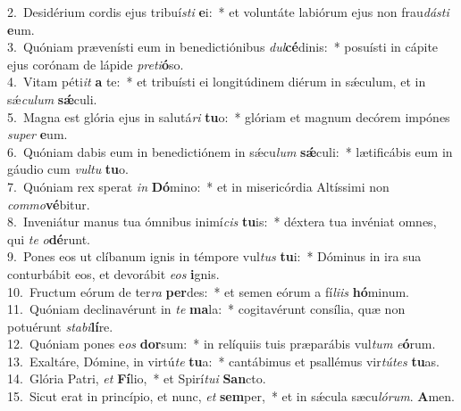 {2.~}Desidérium cordis ejus tribuí\textit{sti} \textbf{e}i:~* et voluntáte labiórum ejus non frau\textit{dá}\textit{sti} \textbf{e}um.\\
{3.~}Quóniam prævenísti eum in benedictiónibus \textit{dul}\textbf{cé}dinis:~* posuísti in cápite ejus corónam de lápide \textit{pre}\textit{ti}\textbf{ó}so.\\
{4.~}Vitam péti\textit{it} \textbf{a} te:~* et tribuísti ei longitúdinem diérum in sǽculum, et in sǽ\textit{cu}\textit{lum} \textbf{sǽ}culi.\\
{5.~}Magna est glória ejus in salutá\textit{ri} \textbf{tu}o:~* glóriam et magnum decórem impónes \textit{su}\textit{per} \textbf{e}um.\\
{6.~}Quóniam dabis eum in benedictiónem in sǽcu\textit{lum} \textbf{sǽ}culi:~* lætificábis eum in gáudio cum \textit{vul}\textit{tu} \textbf{tu}o.\\
{7.~}Quóniam rex sperat \textit{in} \textbf{Dó}mino:~* et in misericórdia Altíssimi non \textit{com}\textit{mo}\textbf{vé}bitur.\\
{8.~}Inveniátur manus tua ómnibus inimí\textit{cis} \textbf{tu}is:~* déxtera tua invéniat omnes, qui \textit{te} \textit{o}\textbf{dé}runt.\\
{9.~}Pones eos ut clíbanum ignis in témpore vul\textit{tus} \textbf{tu}i:~* Dóminus in ira sua conturbábit eos, et devorábit \textit{e}\textit{os} \textbf{i}gnis.\\
{10.~}Fructum eórum de ter\textit{ra} \textbf{per}des:~* et semen eórum a fí\textit{li}\textit{is} \textbf{hó}minum.\\
{11.~}Quóniam declinavérunt in \textit{te} \textbf{ma}la:~* cogitavérunt consília, quæ non potuérunt \textit{sta}\textit{bi}\textbf{lí}re.\\
{12.~}Quóniam pones e\textit{os} \textbf{dor}sum:~* in relíquiis tuis præparábis vul\textit{tum} \textit{e}\textbf{ó}rum.\\
{13.~}Exaltáre, Dómine, in virtú\textit{te} \textbf{tu}a:~* cantábimus et psallémus vir\textit{tú}\textit{tes} \textbf{tu}as.\\
{14.~}Glória Patri, \textit{et} \textbf{Fí}lio,~* et Spirí\textit{tu}\textit{i} \textbf{San}cto.\\
{15.~}Sicut erat in princípio, et nunc, \textit{et} \textbf{sem}per,~* et in sǽcula sæcu\textit{ló}\textit{rum}. \textbf{A}men.\\
